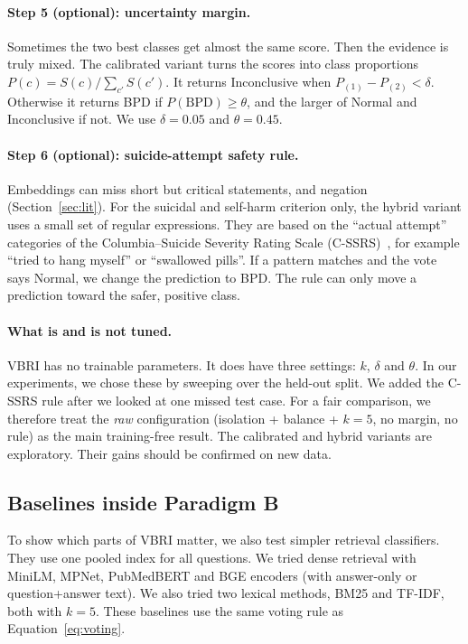 \documentclass[11pt]{article}
\newcommand{\vbri}{VBRI}
\begin{document}
\paragraph{Step 5 (optional): uncertainty margin.}
Sometimes the two best classes get almost the same score. Then the evidence is truly mixed. The
calibrated variant turns the scores into class proportions $P(c)=S(c)/\sum_{c'}S(c')$. It returns
Inconclusive when $P_{(1)}-P_{(2)} < \delta$. Otherwise it returns BPD if $P(\text{BPD})\ge\theta$,
and the larger of Normal and Inconclusive if not. We use $\delta=0.05$ and $\theta=0.45$.

\paragraph{Step 6 (optional): suicide-attempt safety rule.}
Embeddings can miss short but critical statements, and negation (Section~\ref{sec:lit}). For the
suicidal and self-harm criterion only, the hybrid variant uses a small set of regular expressions.
They are based on the ``actual attempt'' categories of the Columbia--Suicide Severity Rating Scale
(C-SSRS)~\cite{posner2011cssrs}, for example ``tried to hang myself'' or ``swallowed pills''. If a
pattern matches and the vote says Normal, we change the prediction to BPD. The rule can only move a
prediction toward the safer, positive class.

\paragraph{What is and is not tuned.}
\vbri{} has no trainable parameters. It does have three settings: $k$, $\delta$ and $\theta$. In our
experiments, we chose these by sweeping over the held-out split. We added the C-SSRS rule after we
looked at one missed test case. For a fair comparison, we therefore treat the \emph{raw}
configuration (isolation + balance + $k=5$, no margin, no rule) as the main training-free result.
The calibrated and hybrid variants are exploratory. Their gains should be confirmed on new data.

\subsection{Baselines inside Paradigm B}

To show which parts of \vbri{} matter, we also test simpler retrieval classifiers. They use one
pooled index for all questions. We tried dense retrieval with MiniLM, MPNet, PubMedBERT and BGE
encoders (with answer-only or question+answer text). We also tried two lexical methods, BM25 and
TF-IDF, both with $k=5$. These baselines use the same voting rule as Equation~\eqref{eq:voting}.
\end{document}
